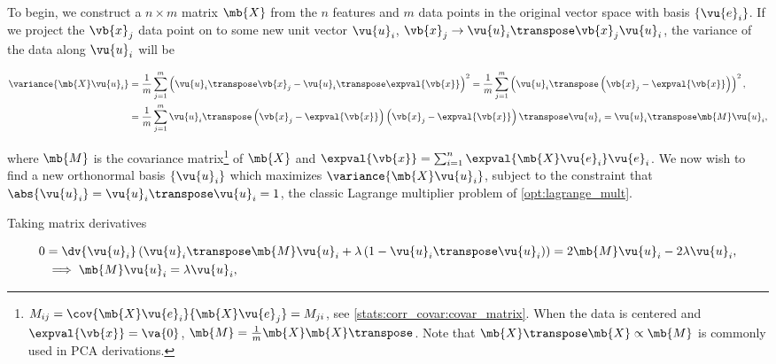 To begin, we construct a $n \times m$ matrix $\mb{X}$
from the $n$ features and $m$ data points in the original vector space
with basis $\left\{\vu{e}_{i}\right\}$.
If we project the $\vb{x}_{j}$ data point on to
some new unit vector $\vu{u}_{i}$,
$\vb{x}_{j} \to \vu{u}_{i}\transpose \vb{x}_{j} \vu{u}_{i}$,
the variance of the data along $\vu{u}_{i}$ will be

\begin{subequations}\label{eq:PCA:variance}
\begin{align}
\variance{\mb{X} \vu{u}_{i}}
&= \frac{1}{m}\sum_{j=1}^{m} \left(
\vu{u}_{i}\transpose \vb{x}_{j}
-
\vu{u}_{i}\transpose \expval{\vb{x}}
\right)^{2}
= \frac{1}{m}\sum_{j=1}^{m} \left( \vu{u}_{i}\transpose \left(\vb{x}_{j} - \expval{\vb{x}}\right)\right)^{2}, \label{eq:PCA:variance:a} \\
&= \frac{1}{m}\sum_{j=1}^{m}
\vu{u}_{i}\transpose
\left(\vb{x}_{j} - \expval{\vb{x}}\right)
\left(\vb{x}_{j} - \expval{\vb{x}}\right)\transpose
\vu{u}_{i}
= \vu{u}_{i}\transpose \mb{M} \vu{u}_{i}, \label{eq:PCA:variance:M}
\end{align}
\end{subequations}

\noindent where $\mb{M}$ is
the covariance matrix\footnote{$M_{ij} = \cov{\mb{X} \vu{e}_{i}}{\mb{X} \vu{e}_{j}} = M_{ji}$,
see \cref{stats:corr_covar:covar_matrix}.
When the data is centered and $\expval{\vb{x}} = \va{0}$,
$\mb{M} = \frac{1}{m} \mb{X} \mb{X}\transpose$.
Note that $\mb{X}\transpose \mb{X} \propto \mb{M}$
is commonly used in PCA derivations.} of $\mb{X}$
and $\expval{\vb{x}} = \sum_{i=1}^{n} \expval{\mb{X} \vu{e}_{i}} \vu{e}_{i}$.
We now wish to find a new orthonormal basis $\left\{\vu{u}_{i}\right\}$
which maximizes $\variance{\mb{X} \vu{u}_{i}}$,
subject to the constraint that $\abs{\vu{u}_{i}} = \vu{u}_{i}\transpose \vu{u}_{i} = 1$,
\ie the classic Lagrange multiplier problem of \cref{opt:lagrange_mult}.

Taking matrix derivatives

\begin{subequations}\label{eq:PCA:lagrange}
\begin{align}
0 &= \dv{\vu{u}_{i}} \left( \vu{u}_{i}\transpose \mb{M} \vu{u}_{i}
+ \lambda \left( 1 - \vu{u}_{i}\transpose \vu{u}_{i} \right) \right)
= 2 \mb{M} \vu{u}_{i} - 2 \lambda \vu{u}_{i}, \label{eq:PCA:lagrange:setup} \\
&\implies \mb{M}\vu{u}_{i} = \lambda \vu{u}_{i}, \label{eq:PCA:lagrange:eigen}
\end{align}
\end{subequations}

